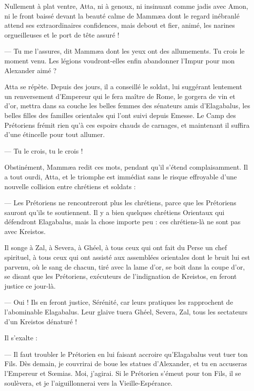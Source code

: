 \documentclass[a4paper, 11pt, oneside, polutonikogreek, french]{article}
\begin{document}
Nullement à plat ventre, Atta, ni à genoux, ni insinuant comme jadis avec Amon, ni le front baissé devant la beauté calme de Mammæa dont le regard inébranlé attend ses extraordinaires confidences, mais debout et fier, animé, les narines orgueilleuses et le port de tête assuré !

--- Tu me l'assures, dit Mammæa dont les yeux ont des allumements. Tu crois le moment venu. Les légions voudront-elles enfin abandonner l'Impur pour mon Alexander aimé ?

Atta se répète. Depuis des jours, il a conseillé le soldat, lui suggérant lentement un renversement d'Empereur qui le fera maître de Rome, le gorgera de vin et d'or, mettra dans sa couche les belles femmes des sénateurs amis d'Elagabalus, les belles filles des familles orientales qui l'ont suivi depuis Emesse. Le Camp des Prétoriens frémit rien qu'à ces espoirs chauds de carnages, et maintenant il suffira d'une étincelle pour tout allumer.

--- Tu le crois, tu le crois !

Obstinément, Mammæa redit ces mots, pendant qu'il s'étend complaisamment. Il a tout ourdi, Atta, et le triomphe est immédiat sans le risque effroyable d'une nouvelle collision entre chrétiens et soldats :

--- Les Prétoriens ne rencontreront plus les chrétiens, parce que les Prétoriens sauront qu'ils te soutiennent. Il y a bien quelques chrétiens Orientaux qui défendront Elagabalus, mais la chose importe peu : ces chrétiens-là ne sont pas avec Kreistos.

Il songe à Zal, à Severa, à Ghéel, à tous ceux qui ont fait du Perse un chef spirituel, à tous ceux qui ont assisté aux assemblées orientales dont le bruit lui est parvenu, où le sang de chacun, tiré avec la lame d'or, se boit dans la coupe d'or, se disant que les Prétoriens, exécuteurs de l'indignation de Kreistos, en feront justice ce jour-là.

--- Oui ! Ils en feront justice, Sérénité, car leurs pratiques les rapprochent de l'abominable Elagabalus. Leur glaive tuera Ghéel, Severa, Zal, tous les sectateurs d'un Kreistos dénaturé !

Il s'exalte :

--- Il faut troubler le Prétorien en lui faisant accroire qu'Elagabalus veut tuer ton Fils. Dès demain, je couvrirai de boue les statues d'Alexander, et tu en accuseras l'Empereur et Sœmias. Moi, j'agirai. Si le Prétorien s'émeut pour ton Fils, il se soulèvera, et je l'aiguillonnerai vers la Vieille-Espérance.
\end{document}
